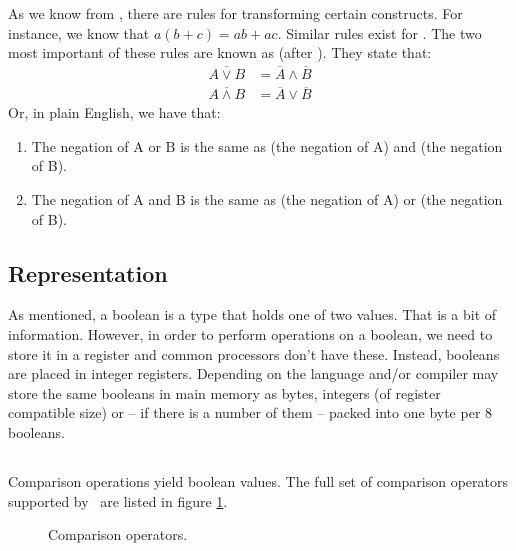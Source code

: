 As we know from , there are rules for transforming certain constructs. For instance, we know that $a(b+c) = ab + ac$. Similar rules exist for . The two most important of these rules are known as  (after ). They state that:
\begin{align*}
  \overline{A \vee B} &= \overline{A} \wedge \overline{B} \\
  \overline{A \wedge B} &= \overline{A} \vee \overline{B}
\end{align*}
Or, in plain English, we have that:
\begin{enumerate}
  \item The negation of A or B is the same as (the negation of A) and (the negation of B).
  \item The negation of A and B is the same as (the negation of A) or (the negation of B).
\end{enumerate}

\subsection{Representation}

As mentioned, a boolean is a type that holds one of two values. That is a bit of information. However, in order to perform operations on a boolean, we need to store it in a register and common processors don't have these. Instead, booleans are placed in integer registers. Depending on the language and/or compiler may store the same booleans in main memory as bytes, integers (of register compatible size) or -- if there is a number of them -- packed into one byte per 8 booleans.

\subsection{\csharp}

Comparison operations yield boolean values. The full set of comparison operators supported by \csharp\ are listed in figure \ref{fig:prim:bool:comparison}.

\begin{figure}[tbp]
  
  \caption{Comparison operators.}
  \label{fig:prim:bool:comparison}
\end{figure}


